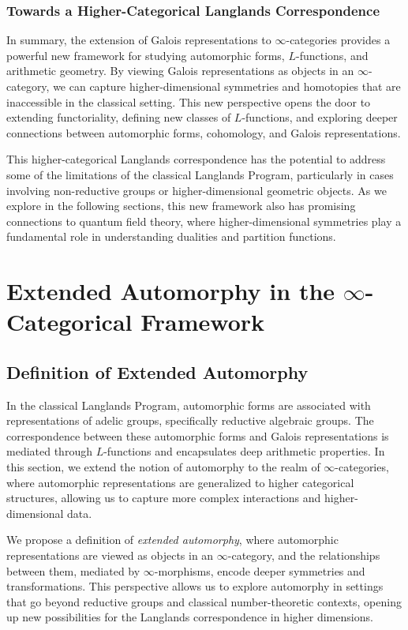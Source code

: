 \documentclass{article}
\theoremstyle{remark}
\begin{document}
\subsubsection{Towards a Higher-Categorical Langlands Correspondence}

In summary, the extension of Galois representations to $\infty$-categories provides a powerful new framework for studying automorphic forms, $L$-functions, and arithmetic geometry. By viewing Galois representations as objects in an $\infty$-category, we can capture higher-dimensional symmetries and homotopies that are inaccessible in the classical setting. This new perspective opens the door to extending functoriality, defining new classes of $L$-functions, and exploring deeper connections between automorphic forms, cohomology, and Galois representations.

This higher-categorical Langlands correspondence has the potential to address some of the limitations of the classical Langlands Program, particularly in cases involving non-reductive groups or higher-dimensional geometric objects. As we explore in the following sections, this new framework also has promising connections to quantum field theory, where higher-dimensional symmetries play a fundamental role in understanding dualities and partition functions.
\section{Extended Automorphy in the $\infty$-Categorical Framework}

\subsection{Definition of Extended Automorphy}

In the classical Langlands Program, automorphic forms are associated with representations of adelic groups, specifically reductive algebraic groups. The correspondence between these automorphic forms and Galois representations is mediated through $L$-functions and encapsulates deep arithmetic properties. In this section, we extend the notion of automorphy to the realm of $\infty$-categories, where automorphic representations are generalized to higher categorical structures, allowing us to capture more complex interactions and higher-dimensional data.

We propose a definition of \textit{extended automorphy}, where automorphic representations are viewed as objects in an $\infty$-category, and the relationships between them, mediated by $\infty$-morphisms, encode deeper symmetries and transformations. This perspective allows us to explore automorphy in settings that go beyond reductive groups and classical number-theoretic contexts, opening up new possibilities for the Langlands correspondence in higher dimensions.
\end{document}
